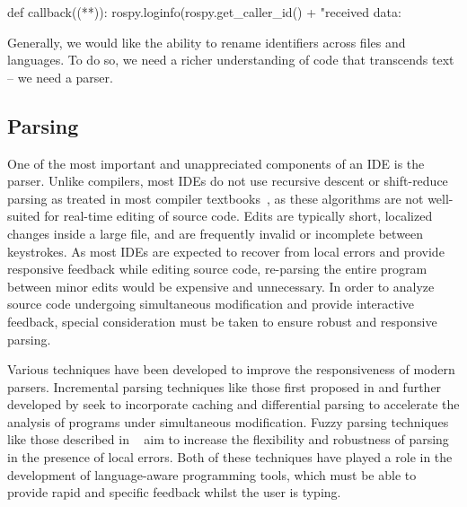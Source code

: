 \documentclass[12pt,initial,twoside,maitrise]{dms}
\numberwithin{equation}{section}
\numberwithin{table}{chapter}
\numberwithin{figure}{chapter}
\begin{document}
\begin{pythonlisting}
def callback((**)):
    rospy.loginfo(rospy.get_caller_id() + "received data: %
\end{pythonlisting}
%
Generally, we would like the ability to rename identifiers across files and languages. To do so, we need a richer understanding of code that transcends text -- we need a parser.

\subsection{Parsing}\label{subsec:the-parser}

One of the most important and unappreciated components of an IDE is the parser. Unlike compilers, most IDEs do not use recursive descent or shift-reduce parsing as treated in most compiler textbooks~\citep{appel2003modern}, as these algorithms are not well-suited for real-time editing of source code. Edits are typically short, localized changes inside a large file, and are frequently invalid or incomplete between keystrokes. As most IDEs are expected to recover from local errors and provide responsive feedback while editing source code, re-parsing the entire program between minor edits would be expensive and unnecessary. In order to analyze source code undergoing simultaneous modification and provide interactive feedback, special consideration must be taken to ensure robust and responsive parsing.

Various techniques have been developed to improve the responsiveness of modern parsers. Incremental parsing techniques like those first proposed in \citet{ghezzi1979incremental} and further developed by \citet{wagner1997practical,wagner1997incremental} seek to incorporate caching and differential parsing to accelerate the analysis of programs under simultaneous modification. Fuzzy parsing techniques like those described in ~\citet{koppler1997systematic} aim to increase the flexibility and robustness of parsing in the presence of local errors. Both of these techniques have played a role in the development of language-aware programming tools, which must be able to provide rapid and specific feedback whilst the user is typing.
\end{document}
